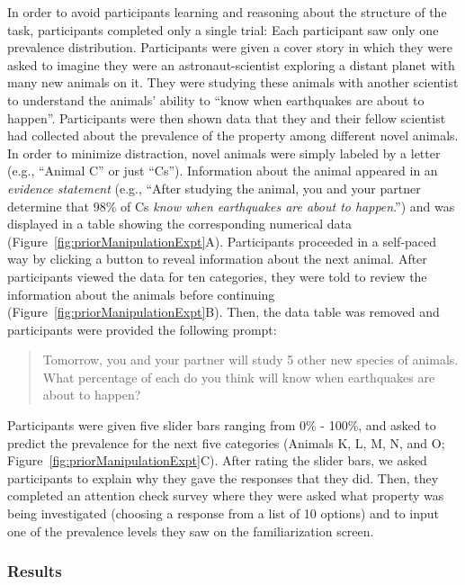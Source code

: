 \documentclass[floatsintext,doc]{apa6}
\begin{document}
%
In order to avoid participants learning and reasoning about the structure of the task, participants completed only a single trial: Each participant saw only one prevalence distribution.
Participants were given a cover story in which they were asked to imagine they were an astronaut-scientist exploring a distant planet with many new animals on it.
They were studying these animals with another scientist to understand the animals' ability to \enquote{know when earthquakes are about to happen}.
Participants were then shown data that they and their fellow scientist had collected about the prevalence of the property among different novel animals.
In order to minimize distraction, novel animals were simply labeled by a letter (e.g., \enquote{Animal C} or just \enquote{Cs}).
Information about the animal appeared in an \emph{evidence statement} (e.g., \enquote{After studying the animal, you and your partner determine that 98\% of Cs \emph{know when earthquakes are about to happen}.}) and was displayed in a table showing the corresponding numerical data (Figure~\ref{fig:priorManipulationExpt}A).
Participants proceeded in a self-paced way by clicking a button to reveal information about the next animal.
After participants viewed the data for ten categories, they were told to review the information about the animals before continuing (Figure~\ref{fig:priorManipulationExpt}B).
Then, the data table was removed and participants were provided the following prompt:

\begin{quote}
Tomorrow, you and your partner will study 5 other new species of animals. What percentage of each do you think will know when earthquakes are about to happen?
\end{quote}

Participants were given five slider bars ranging from 0\% - 100\%, and asked to predict the prevalence for the next five categories (Animals K, L, M, N, and O; Figure~\ref{fig:priorManipulationExpt}C).
After rating the slider bars, we asked participants to explain why they gave the responses that they did.
Then, they completed an attention check survey where they were asked what property was being investigated (choosing a response from a list of 10 options) and to input one of the prevalence levels they saw on the familiarization screen.

\hypertarget{results-1}{%
\subsubsection{Results}\label{results-1}}
\end{document}
